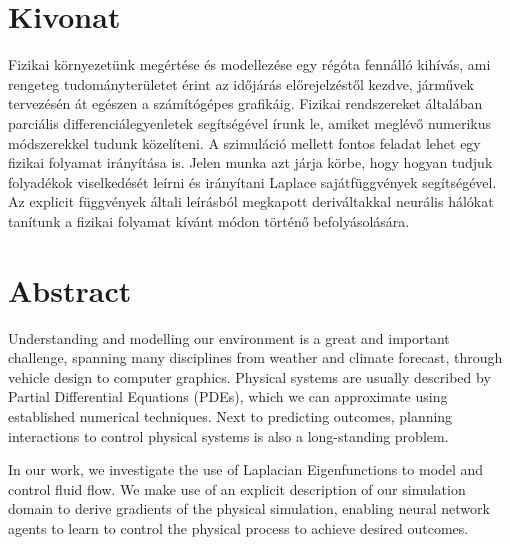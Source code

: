 \setcounter{page}{1}

\selecthungarian

\chapter*{Kivonat}

Fizikai környezetünk megértése és modellezése egy régóta fennálló kihívás, ami
rengeteg tudományterületet érint az időjárás előrejelzéstől kezdve, járművek
tervezésén át egészen a számítógépes grafikáig. Fizikai rendszereket általában
parciális differenciálegyenletek segítségével írunk le, amiket meglévő numerikus
módszerekkel tudunk közelíteni. A szimuláció mellett fontos feladat lehet egy
fizikai folyamat irányítása is.  Jelen munka azt járja körbe, hogy hogyan tudjuk
folyadékok viselkedését leírni és irányítani Laplace sajátfüggvények
segítségével. Az explicit függvények általi leírásból megkapott deriváltakkal
neurális hálókat tanítunk a fizikai folyamat kívánt módon történő
befolyásolására.


\vfill
\selectenglish

\chapter*{Abstract}

Understanding and modelling our environment is a great and important challenge,
spanning many disciplines from weather and climate forecast, through vehicle
design to computer graphics. Physical systems are usually described by Partial
Differential Equations (PDEs), which we can approximate using established
numerical techniques. Next to predicting outcomes, planning interactions to
control physical systems is also a long-standing problem.

In our work, we investigate the use of Laplacian Eigenfunctions to model and
control fluid flow. We make use of an explicit description of our simulation
domain to derive gradients of the physical simulation, enabling neural network
agents to learn to control the physical process to achieve desired outcomes.

\vfill
\cleardoublepage

\selectthesislanguage

\setcounter{romanPage}{\value{page}}
